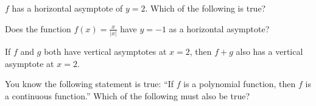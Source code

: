 \documentclass{ximera}
\newcommand{\recommendation}[1]{}
\newcommand{\GoodQuestions}[1]{}
\begin{document}
\begin{problem}
	$f$ has a horizontal asymptote of $y = 2$.  Which of the following is true?
	\begin{multipleChoice}
	\end{multipleChoice}
\end{problem}

\begin{problem}
  Does the function $f(x) = \frac{x}{|x|}$ have $y=-1$ as a horizontal asymptote?
  \begin{multipleChoice}
	\choice[correct]{Yes}
	\choice{No}
  \end{multipleChoice}
\end{problem}

\begin{problem}
  If $f$ and $g$ both have vertical asymptotes at $x=2$, then
  $f+g$ also has a vertical asymptote at $x=2$.
  \begin{multipleChoice}
  \end{multipleChoice}
\end{problem}




\begin{problem}
  \recommendation{Elizabeth}
  \GoodQuestions{Subject: Continuity and the Intermediate Value
    Theorem 4Q}

  You know the following statement is true: ``If $f$ is a polynomial
  function, then $f$ is a continuous function.''  Which of the
  following must also be true?
  \begin{multipleChoice}
  \end{multipleChoice}
\end{problem}
\end{document}
